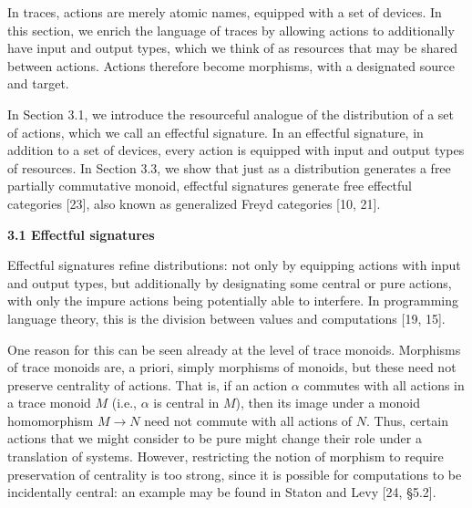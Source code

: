 \documentclass[10pt,a4paper]{article}
\begin{document}
In traces, actions are merely atomic names, equipped with a set of devices. In this section, we enrich the language of traces by allowing actions to additionally have input and output types, which we think of as resources that may be shared between actions. Actions therefore become morphisms, with a designated source and target.\par
 
 
 
In Section 3.1, we introduce the resourceful analogue of the distribution of a set of actions, which we call an effectful signature. In an effectful signature, in addition to a set of devices, every action is equipped with input and output types of resources. In Section 3.3, we show that just as a distribution generates a free partially commutative monoid, effectful signatures generate free effectful categories [23], also known as generalized Freyd categories [10, 21].\par
 
 
 
\par\medskip\noindent\textbf{3.1 Effectful signatures}\par
 
 
Effectful signatures refine distributions: not only by equipping actions with input and output types, but additionally by designating some central or pure actions, with only the impure actions being potentially able to interfere. In programming language theory, this is the division between values and computations [19, 15].\par
 
 
 
One reason for this can be seen already at the level of trace monoids. Morphisms of trace monoids are, a priori, simply morphisms of monoids, but these need not preserve centrality of actions. That is, if an action $\alpha$ commutes with all actions in a trace monoid $M$ (i.e., $\alpha$ is central in $M$), then its image under a monoid homomorphism $M\to N$ need not commute with all actions of $N$. Thus, certain actions that we might consider to be pure might change their role under a translation of systems. However, restricting the notion of morphism to require preservation of centrality is too strong, since it is possible for computations to be incidentally central: an example may be found in Staton and Levy [24, §5.2].\par
 
\end{document}
